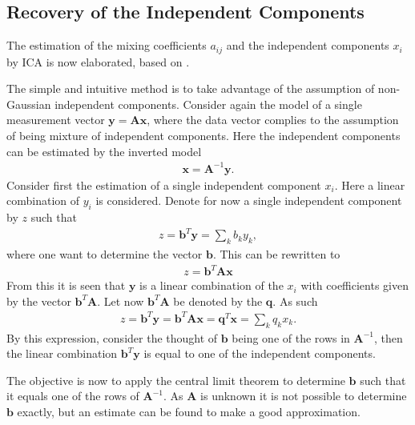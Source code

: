 \subsection{Recovery of the Independent Components}\label{sec:est_ica}
The estimation of the mixing coefficients $a_{ij}$ and the independent components $x_i$ by ICA is now elaborated, based on \cite[p. 166]{ICA}.  

The simple and intuitive method is to take advantage of the assumption of non-Gaussian independent components. 
Consider again the model of a single measurement vector $\mathbf{y} = \mathbf{Ax}$, where the data vector complies to the assumption of being mixture of independent components. Here the independent components can be estimated by the inverted model
\begin{align*}
\mathbf{x} = \mathbf{A}^{-1} \mathbf{y}.
\end{align*}
Consider first the estimation of a single independent component $x_i$.
Here a linear combination of $y_i$ is considered. Denote for now a single independent component by $z$ such that
\begin{align}
z = \mathbf{b}^T \mathbf{y} = \sum_k b_k y_k, \label{eq:ICA_comp}
\end{align} 
where one want to determine the vector $\mathbf{b}$. This can be rewritten to 
\begin{align*}
z = \mathbf{b}^T \mathbf{Ax}
\end{align*} 
From this it is seen that $\mathbf{y}$ is a linear combination of the $x_i$ with coefficients given by the vector $\mathbf{b}^T \mathbf{A}$.
Let now $\mathbf{b}^T \mathbf{A}$ be denoted by the $\textbf{q}$. As such  
\begin{align}
z = \mathbf{b}^T \mathbf{y} = \mathbf{b}^T \mathbf{Ax} = \mathbf{q}^T \mathbf{x} = \sum_k q_k x_k. \label{eq:ICA_comp2} 
\end{align}
By this expression, consider the thought of $\mathbf{b}$ being one of the rows in $\mathbf{A}^{-1}$, then the linear combination $\mathbf{b}^{T}\mathbf{y}$ is equal to one of the independent components. 
 
The objective is now to apply the central limit theorem to determine $\mathbf{b}$ such that it equals one of the rows of $\mathbf{A}^{-1}$. 
As $\mathbf{A}$ is unknown it is not possible to determine $\mathbf{b}$ exactly, but an estimate can be found to make a good approximation.

